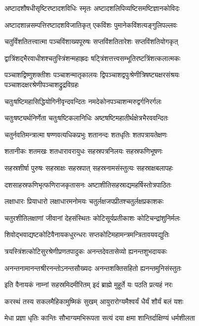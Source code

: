 \twolineshloka
{अष्टादशौषधीसृष्टिरष्टादशविधिः स्मृतः}
{अष्टादशलिपिव्यष्टिसमष्टिज्ञानकोविदः}

\twolineshloka
{अष्टादशान्नसम्पत्तिरष्टादशविजातिकृत्}
{एकविंशः पुमानेकविंशत्यङ्गुलिपल्लवः}

\twolineshloka
{चतुर्विंशतितत्त्वात्मा पञ्चविंशाख्यपूरुषः}
{सप्तविंशतितारेशः सप्तविंशतियोगकृत्}

\twolineshloka
{द्वात्रिंशद्भैरवाधीशश्चतुस्त्रिंशन्महाह्रदः}
{षट्त्रिंशत्तत्त्वसम्भूतिरष्टत्रिंशत्कलात्मकः}

\threelineshloka
{पञ्चाशद्विष्णुशक्तीशः पञ्चाशन्मातृकालयः}
{द्विपञ्चाशद्वपुःश्रेणीत्रिषष्ट्यक्षरसंश्रयः}
{पञ्चाशदक्षरश्रेणीपञ्चाशद्रुद्रविग्रहः}

\twolineshloka
{चतुःषष्टिमहासिद्धियोगिनीवृन्दवन्दितः}
{नमदेकोनपञ्चाशन्मरुद्वर्गनिरर्गलः}

\twolineshloka
{चतुःषष्ट्यर्थनिर्णेता चतुःषष्टिकलानिधिः}
{अष्टषष्टिमहातीर्थक्षेत्रभैरववन्दितः}

\twolineshloka
{चतुर्नवतिमन्त्रात्मा षण्णवत्यधिकप्रभुः}
{शतानन्दः शतधृतिः शतपत्रायतेक्षणः}

\twolineshloka
{शतानीकः शतमखः शतधारावरायुधः}
{सहस्रपत्रनिलयः सहस्रफणिभूषणः}

\twolineshloka
{सहस्रशीर्षा पुरुषः सहस्राक्षः सहस्रपात्}
{सहस्रनामसंस्तुत्यः सहस्राक्षबलापहः}

\twolineshloka
{दशसाहस्रफणिभृत्फणिराजकृतासनः}
{अष्टाशीतिसहस्राद्यमहर्षिस्तोत्रपाठितः}

\twolineshloka
{लक्षाधारः प्रियाधारो लक्षाधारमनोमयः}
{चतुर्लक्षजपप्रीतश्चतुर्लक्षप्रकाशकः}

\twolineshloka
{चतुरशीतिलक्षाणां जीवानां देहसंस्थितः}
{कोटिसूर्यप्रतीकाशः कोटिचन्द्रांशुनिर्मलः}

\twolineshloka
{शिवोद्भवाद्यष्टकोटिवैनायकधुरन्धरः}
{सप्तकोटिमहामन्त्रमन्त्रितावयवद्युतिः}

\twolineshloka
{त्रयस्त्रिंशत्कोटिसुरश्रेणीप्रणतपादुकः}
{अनन्तदेवतासेव्यो ह्यनन्तशुभदायकः}

\twolineshloka
{अनन्तनामानन्तश्रीरनन्तोऽनन्तसौख्यदः}
{अनन्तशक्तिसहितो ह्यनन्तमुनिसंस्तुतः}


\twolineshloka
{इति वैनायकं नाम्नां सहस्रमिदमीरितम्}
{इदं ब्राह्मे मुहूर्ते यः पठति प्रत्यहं नरः}

\twolineshloka
{करस्थं तस्य सकलमैहिकामुष्मिकं सुखम्}
{आयुरारोग्यमैश्वर्यं धैर्यं शौर्यं बलं यशः}

\twolineshloka
{मेधा प्रज्ञा धृतिः कान्तिः सौभाग्यमभिरूपता}
{सत्यं दया क्षमा शान्तिर्दाक्षिण्यं धर्मशीलता}

